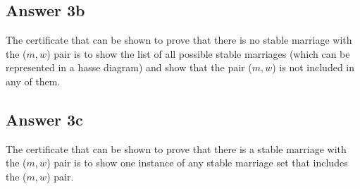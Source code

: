 \documentclass[twoside]{article}
\begin{document}
\subsection{Answer 3b}

The certificate that can be shown to prove that there is no stable marriage with the ($m, w$) pair is to show the list of all possible stable marriages (which can be represented in a hasse diagram) and show that the pair 
($m, w$) is not included in any of them. \\  

\subsection{Answer 3c}

The certificate that can be shown to prove that there is a stable marriage with the ($m, w$) pair is to show one instance of any stable marriage set that includes the ($m, w$) pair. 
\end{document}
